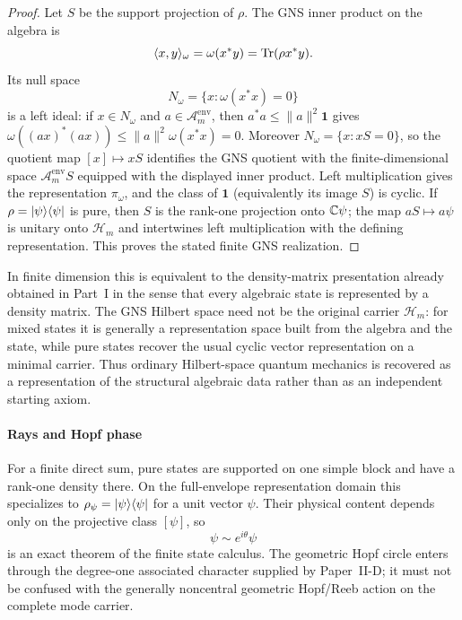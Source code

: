 \documentclass[12pt,a4paper]{article}
\begin{document}
\begin{proof}
Let \(S\) be the support projection of \(\rho\).  The GNS inner product on the algebra is
\[
  \langle x,y\rangle_\omega=\omega(x^*y)=\operatorname{Tr}(\rho x^*y).
\]
Its null space
\[
N_\omega=\{x:\omega(x^*x)=0\}
\]
is a left ideal: if \(x\in N_\omega\) and \(a\in\mathcal A_m^{\mathrm{env}}\),
then \(a^*a\le\|a\|^2\mathbf1\) gives
\(\omega((ax)^*(ax))\le\|a\|^2\omega(x^*x)=0\).
Moreover \(N_\omega=\{x:xS=0\}\), so the quotient map
\([x]\mapsto xS\) identifies the GNS quotient with the finite-dimensional
space \(\mathcal A_m^{\mathrm{env}}S\) equipped with the displayed inner
product.  Left multiplication gives the representation \(\pi_\omega\), and
the class of \(\mathbf1\) (equivalently its image \(S\)) is cyclic.  If
\(\rho=\lvert \psi \rangle\langle \psi \rvert\) is pure, then \(S\) is the rank-one projection
onto \(\mathbb{C}\psi\); the map \(aS\mapsto a\psi\) is unitary onto
\(\mathcal H_m\) and intertwines left multiplication with the defining
representation.  This proves the stated finite GNS realization.
\end{proof}


In finite dimension this is equivalent to the density-matrix presentation already obtained in Part~I in the sense that every algebraic state is represented by a density matrix. The GNS Hilbert space need not be the original carrier $\mathcal H_m$: for mixed states it is generally a representation space built from the algebra and the state, while pure states recover the usual cyclic vector representation on a minimal carrier. Thus ordinary Hilbert-space quantum mechanics is recovered as a representation of the structural algebraic data rather than as an independent starting axiom.



\paragraph{Rays and Hopf phase}
\label{p4:sec:part2-hopf-rays}

For a finite direct sum, pure states are supported on one simple block and
have a rank-one density there.  On the full-envelope representation domain
this specializes to
\(\rho_\psi=\lvert \psi \rangle\langle \psi \rvert\) for a unit vector \(\psi\).
Their physical content depends only on the projective class \([\psi]\), so
\[
\psi\sim e^{i\theta}\psi
\]
is an exact theorem of the finite state calculus.  The geometric Hopf circle
enters through the degree-one associated character supplied by Paper~II-D; it
must not be confused with the generally noncentral geometric Hopf/Reeb action
on the complete mode carrier.
\end{document}
